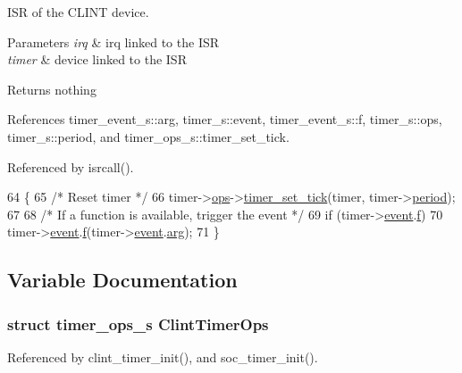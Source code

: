 I\-S\-R of the C\-L\-I\-N\-T device. 


\begin{DoxyParams}{Parameters}
{\em irq} & irq linked to the I\-S\-R \\
\hline
{\em timer} & device linked to the I\-S\-R \\
\hline
\end{DoxyParams}
\begin{DoxyReturn}{Returns}
nothing 
\end{DoxyReturn}


References timer\-\_\-event\-\_\-s\-::arg, timer\-\_\-s\-::event, timer\-\_\-event\-\_\-s\-::f, timer\-\_\-s\-::ops, timer\-\_\-s\-::period, and timer\-\_\-ops\-\_\-s\-::timer\-\_\-set\-\_\-tick.



Referenced by isrcall().


\begin{DoxyCode}
64 \{
65     \textcolor{comment}{/* Reset timer */}
66     timer->\hyperlink{structtimer__s_a859db5220e0605eabaa9100121940b5e}{ops}->\hyperlink{structtimer__ops__s_a4c7be27a967a8aa56bfb785e80afb254}{timer\_set\_tick}(timer, timer->\hyperlink{structtimer__s_a9174e40ce5a0ea4f7072968f377d27b5}{period});
67 
68     \textcolor{comment}{/* If a function is available, trigger the event */}
69     \textcolor{keywordflow}{if} (timer->\hyperlink{structtimer__s_ad65ea18f2fc79735a86d6ba118933f5b}{event}.\hyperlink{structtimer__event__s_a894a5ffd0c1b40b31fd3b124f22a9ffa}{f})
70         timer->\hyperlink{structtimer__s_ad65ea18f2fc79735a86d6ba118933f5b}{event}.\hyperlink{structtimer__event__s_a894a5ffd0c1b40b31fd3b124f22a9ffa}{f}(timer->\hyperlink{structtimer__s_ad65ea18f2fc79735a86d6ba118933f5b}{event}.\hyperlink{structtimer__event__s_a0c8f6673a1d1e2ae4a8598f72a8e7576}{arg});
71 \}
\end{DoxyCode}


\subsection{Variable Documentation}
\hypertarget{clint-timer_8h_ac6de9c7f0557ed4f63e96d7b02123a00}{
\subsubsection[{Clint\-Timer\-Ops}]{\setlength{\rightskip}{0pt plus 5cm}struct {\bf timer\-\_\-ops\-\_\-s} Clint\-Timer\-Ops}}\label{clint-timer_8h_ac6de9c7f0557ed4f63e96d7b02123a00}


Referenced by clint\-\_\-timer\-\_\-init(), and soc\-\_\-timer\-\_\-init().

